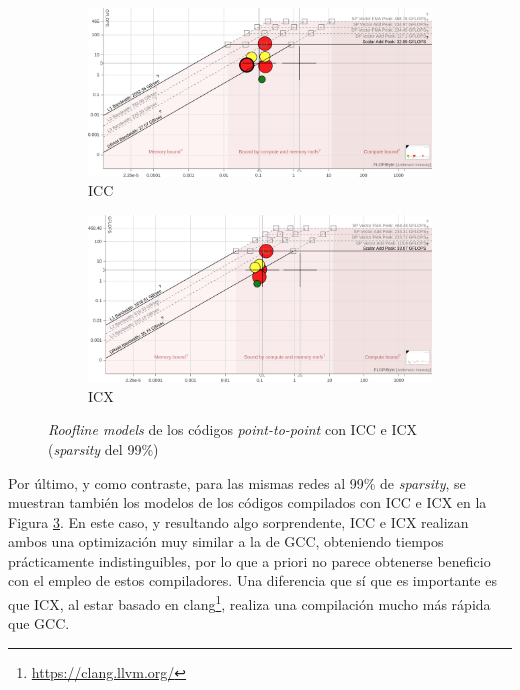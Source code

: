 \begin{figure}[htpb]
    \centering
    \begin{subfigure}[b]{0.495\textwidth}
        \includegraphics[width=\textwidth]{img/rooflines/roofline_p2p_99_icc.png}
        \caption{ICC}
        \label{fig:roofline_p2p_icc_99}
    \end{subfigure}
    \begin{subfigure}[b]{0.495\textwidth}
        \includegraphics[width=\textwidth]{img/rooflines/roofline_p2p_99_icx.png}
        \caption{ICX}
        \label{fig:roofline_p2p_icx_99}
    \end{subfigure}

    \caption{\textit{Roofline models} de los códigos \textit{point-to-point} con ICC e ICX (\textit{sparsity} del 99\%)}
    \label{fig:rooflines_p2p_icc_icx_99}
\end{figure}

Por último, y como contraste, para las mismas redes al 99\% de \textit{sparsity}, se muestran también los modelos de los códigos compilados con ICC e ICX en la Figura \ref{fig:rooflines_p2p_icc_icx_99}. En este caso, y resultando algo sorprendente, ICC e ICX realizan ambos una optimización muy similar a la de GCC, obteniendo tiempos prácticamente indistinguibles, por lo que a priori no parece obtenerse beneficio con el empleo de estos compiladores. Una diferencia que sí que es importante es que ICX, al estar basado en clang\footnote{\url{https://clang.llvm.org/}}, realiza una compilación mucho más rápida que GCC.

